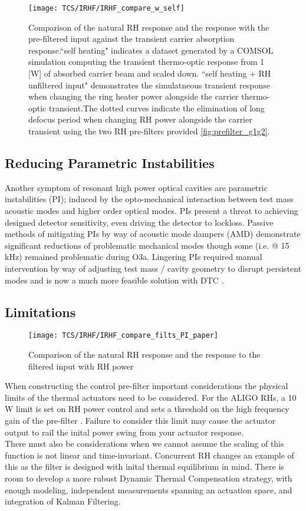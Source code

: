 \begin{figure}[H]
    \centering
    \texttt{[image: TCS/IRHF/IRHF\_compare\_w\_self]}
    \caption{Comparison of the natural RH response and the response with the pre-filtered input against the transient carrier absorption response.``self heating" indicates a dataset generated by a COMSOL simulation computing the transient thermo-optic response from 1 [W] of absorbed carrier beam and scaled down. ``self heating + RH unfiltered input" demonstrates the simulatneous transient response when changing the ring heater power alongside the carrier thermo-optic transient.The dotted curves indicate the elimination of long defocus period when changing RH power alongside the carrier transient using the two RH pre-filters provided \autoref{fig:prefilter_g1g2}.}
    \label{fig:dynam_comparison}
\end{figure}

\subsection{Reducing Parametric Instabilities}
Another symptom of resonant high power optical cavities are parametric instabilities (PI); induced by the opto-mechanical interaction between test mass acoustic modes and higher order optical modes. PIs present a threat to achieving designed detector sensitivity, even driving the detector to lockloss. Passive methods of mitigating PIs by way of acoustic mode dampers (AMD) demonstrate significant reductions of problematic mechanical modes though some (i.e. @ 15 kHz) remained problematic during O3a. Lingering PIs required manual intervention by way of adjusting test mass / cavity geometry to disrupt persistent modes and is now a much more feasible solution with DTC \cite{hardwick:2020}.  

\subsection{Limitations}
\begin{figure}[H]
    \centering
    \texttt{[image: TCS/IRHF/IRHF\_compare\_filts\_PI\_paper]}
    \caption{Comparison of the natural RH response and the response to the filtered input with RH power}
    \label{fig:RH_power}
\end{figure}
When constructing the control pre-filter important considerations the physical limits of the thermal actuators need to be considered. For the ALIGO RHs, a 10 W limit is set on RH power control and sets a threshold on the high frequency gain of the pre-filter \cite{dcc:rhspec}. Failure to consider this limit may cause the actuator output to rail the inital power swing from your actuator response.
\\ 
There must also be considerations when we cannot assume the scaling of this function is not linear and time-invariant. Concurrent RH changes an example of this as the filter is designed with inital thermal equilibrium in mind. There is room to develop a more rubust Dynamic Thermal Compensation strategy, with enough modeling, independent measurements spanning an actuation space, and integration of Kalman Filtering.

